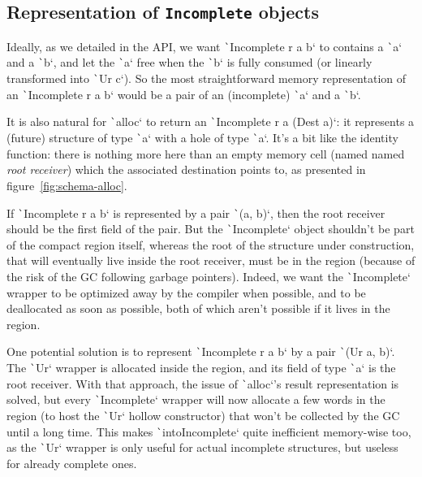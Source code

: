 \documentclass[english]{jflart}
\begin{document}
\subsection{Representation of \texttt{Incomplete} objects}

Ideally, as we detailed in the API, we want \texttt`Incomplete r a b` to contains a \texttt`a` and a \texttt`b`, and let the \texttt`a` free when the \texttt`b` is fully consumed (or linearly transformed into \texttt`Ur c`). So the most straightforward memory representation of an \texttt`Incomplete r a b` would be a pair of an (incomplete) \texttt`a` and a \texttt`b`.

It is also natural for \texttt`alloc` to return an \texttt`Incomplete r a (Dest a)`: it represents a (future) structure of type \texttt`a` with a hole of type \texttt`a`. It's a bit like the identity function: there is nothing more here than an empty memory cell (named named \emph{root receiver}) which the associated destination points to, as presented in figure~\ref{fig:schema-alloc}.

If \texttt`Incomplete r a b` is represented by a pair \texttt`(a, b)`, then the root receiver should be the first field of the pair. But the \texttt`Incomplete` object shouldn't be part of the compact region itself, whereas the root of the structure under construction, that will eventually live inside the root receiver, must be in the region (because of the risk of the GC following garbage pointers). Indeed, we want the \texttt`Incomplete` wrapper to be optimized away by the compiler when possible, and to be deallocated as soon as possible, both of which aren't possible if it lives in the region.

One potential solution is to represent \texttt`Incomplete r a b` by a pair \texttt`(Ur a, b)`. The \texttt`Ur` wrapper is allocated inside the region, and its field of type \texttt`a` is the root receiver. With that approach, the issue of \texttt`alloc`'s result representation is solved, but every \texttt`Incomplete` wrapper will now allocate a few words in the region (to host the \texttt`Ur` hollow constructor) that won't be collected by the GC until a long time. This makes \texttt`intoIncomplete` quite inefficient memory-wise too, as the \texttt`Ur` wrapper is only useful for actual incomplete structures, but useless for already complete ones.
\end{document}
